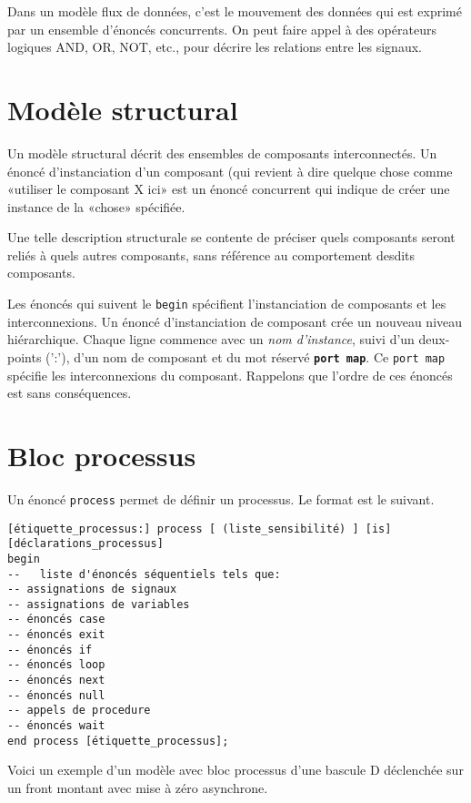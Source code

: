 \documentclass[letter, oneside]{book}
\begin{document}
Dans un modèle flux de données, c'est le mouvement des données qui est
exprimé par un ensemble d'énoncés concurrents. On peut faire appel à
des opérateurs logiques AND, OR, NOT, etc., pour décrire les relations
entre les signaux.

\section{Modèle structural}
\label{sec:orge8463f3}

Un modèle structural décrit des ensembles de composants
interconnectés. Un énoncé d'instanciation d'un composant (qui revient
à dire quelque chose comme «utiliser le composant X ici» est un énoncé
concurrent qui indique de créer une instance de la «chose» spécifiée.

Une telle description structurale se contente de préciser quels
composants seront reliés à quels autres composants, sans référence au
comportement desdits composants.

Les énoncés qui suivent le \texttt{begin} spécifient l'instanciation de
composants et les interconnexions. Un énoncé d'instanciation de
composant crée un nouveau niveau hiérarchique. Chaque ligne commence
avec un \emph{nom d'instance}, suivi d'un deux-points (':'), d'un nom de
composant et du mot réservé \textbf{\texttt{port map}}.  Ce \texttt{port map} spécifie les
interconnexions du composant. Rappelons que l'ordre de ces
énoncés est sans conséquences.

\section{Bloc processus}
\label{sec:org81e244a}

Un énoncé \texttt{process} permet de définir un processus. Le format est le
suivant.

\begin{listing}[htbp]
\begin{verbatim}
[étiquette_processus:] process [ (liste_sensibilité) ] [is]
[déclarations_processus]
begin
--   liste d'énoncés séquentiels tels que:
-- assignations de signaux 
-- assignations de variables
-- énoncés case
-- énoncés exit
-- énoncés if 
-- énoncés loop 
-- énoncés next
-- énoncés null
-- appels de procedure
-- énoncés wait
end process [étiquette_processus];
\end{verbatim}
\caption{Bloc processus}
\end{listing}

Voici un exemple d'un modèle avec bloc processus d'une bascule D
déclenchée sur un front montant avec mise à zéro asynchrone.
\end{document}
